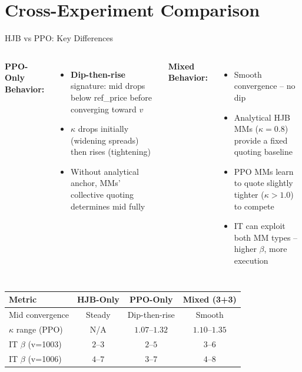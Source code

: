 \documentclass[10pt,aspectratio=169]{beamer}
\begin{document}
\section{Cross-Experiment Comparison}

\begin{frame}{HJB vs PPO: Key Differences}
  \begin{columns}[T]
    \textbf{PPO-Only Behavior:}
    \begin{itemize}
      \item \textbf{Dip-then-rise} signature: mid drops below ref\_price before converging toward $v$
      \item $\kappa$ drops initially (widening spreads) then rises (tightening)
      \item Without analytical anchor, MMs' collective quoting determines mid fully
    \end{itemize}

    \textbf{Mixed Behavior:}
    \begin{itemize}
      \item Smooth convergence -- no dip
      \item Analytical HJB MMs ($\kappa = 0.8$) provide a fixed quoting baseline
      \item PPO MMs learn to quote slightly tighter ($\kappa > 1.0$) to compete
      \item IT can exploit both MM types -- higher $\beta$, more execution
    \end{itemize}
  \end{columns}

  \vspace{8pt}
  \begin{center}
  \begin{tabular}{lccc}
    \toprule
    Metric & HJB-Only & PPO-Only & Mixed (3+3) \\
    \midrule
    Mid convergence & Steady & Dip-then-rise & Smooth \\
    $\kappa$ range (PPO) & N/A & $1.07$--$1.32$ & $1.10$--$1.35$ \\
    IT $\beta$ (v=1003) & $2$--$3$ & $2$--$5$ & $3$--$6$ \\
    IT $\beta$ (v=1006) & $4$--$7$ & $3$--$7$ & $4$--$8$ \\
    \bottomrule
  \end{tabular}
  \end{center}
\end{frame}
\end{document}
